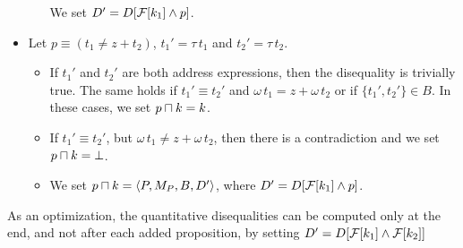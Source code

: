 \begin{itemize}
\begin{itemize}
                    We set $D' = D[\mathcal{F}[k_1] \land p]$.
          \end{itemize}
    \item Let $p \equiv (t_1 \neq z + t_2)$, $t_1'=\tau\,t_1$ and $t_2'=\tau\,t_2$.
          \begin{itemize}
              \item If $t_1'$ and $t_2'$ are both address expressions, then the disequality is trivially true.
                    The same holds if $t_1' \equiv t_2'$ and $\omega\,t_1 = z + \omega\,t_2$
                    or if $\{t_1',t_2'\}\in B$. In these cases, we set $p \sqcap k = k$.
              \item If $t_1' \equiv t_2'$, but $\omega\,t_1 \neq z + \omega\,t_2$, then
                    there is a contradiction and we set $p \sqcap k = \bot$.
              \item We set $p \sqcap k = \langle P,M_P,B,D'\rangle$, where $D' = D[\mathcal{F}[k_1] \land p]$.
          \end{itemize}
\end{itemize}

As an optimization, the quantitative disequalities can be computed only at the end, and not after each added proposition, by setting $D' = D[\mathcal{F}[k_1] \land \mathcal{F}[k_2]]$

